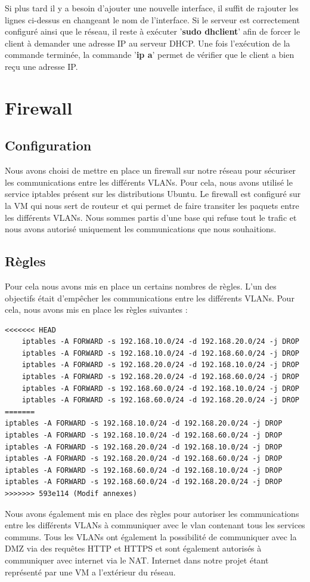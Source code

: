 \documentclass[a4paper,12pt,openany]{report}
\begin{document}
            Si plus tard il y a besoin d'ajouter une nouvelle interface, il suffit de rajouter les lignes ci-dessus en changeant le nom de l'interface.
            Si le serveur est correctement configuré ainsi que le réseau, il reste à exécuter '\textbf{sudo dhclient}' afin de forcer le client à demander une adresse IP au serveur DHCP.
            Une fois l'exécution de la commande terminée, la commande '\textbf{ip a}' permet de vérifier que le client a bien reçu une adresse IP.

        \section{Firewall}
            \subsection{Configuration}
            Nous avons choisi de mettre en place un firewall sur notre réseau pour sécuriser les communications entre les différents VLANs. Pour cela, nous avons utilisé le service iptables présent sur les distributions Ubuntu.
            Le firewall est configuré sur la VM qui nous sert de routeur et qui permet de faire transiter les paquets entre les différents VLANs. Nous sommes partis d'une base qui refuse tout le trafic et nous avons autorisé uniquement les communications que nous souhaitions.

            \subsection{Règles}
            Pour cela nous avons mis en place un certains nombres de règles. L'un des objectifs était d'empêcher les communications entre les différents VLANs. Pour cela, nous avons mis en place les règles suivantes :
            \begin{verbatim}
<<<<<<< HEAD
    iptables -A FORWARD -s 192.168.10.0/24 -d 192.168.20.0/24 -j DROP
    iptables -A FORWARD -s 192.168.10.0/24 -d 192.168.60.0/24 -j DROP
    iptables -A FORWARD -s 192.168.20.0/24 -d 192.168.10.0/24 -j DROP
    iptables -A FORWARD -s 192.168.20.0/24 -d 192.168.60.0/24 -j DROP
    iptables -A FORWARD -s 192.168.60.0/24 -d 192.168.10.0/24 -j DROP
    iptables -A FORWARD -s 192.168.60.0/24 -d 192.168.20.0/24 -j DROP
=======
iptables -A FORWARD -s 192.168.10.0/24 -d 192.168.20.0/24 -j DROP
iptables -A FORWARD -s 192.168.10.0/24 -d 192.168.60.0/24 -j DROP
iptables -A FORWARD -s 192.168.20.0/24 -d 192.168.10.0/24 -j DROP
iptables -A FORWARD -s 192.168.20.0/24 -d 192.168.60.0/24 -j DROP
iptables -A FORWARD -s 192.168.60.0/24 -d 192.168.10.0/24 -j DROP
iptables -A FORWARD -s 192.168.60.0/24 -d 192.168.20.0/24 -j DROP
>>>>>>> 593e114 (Modif annexes)
            \end{verbatim}
            Nous avons également mis en place des règles pour autoriser les communications entre les différents VLANs à communiquer avec le vlan contenant tous les services communs. Tous les VLANs ont également la possibilité de communiquer avec la DMZ via des requêtes HTTP et HTTPS et sont également autorisés à communiquer avec internet via le NAT. Internet dans notre projet étant représenté par une VM a l'extérieur du réseau. 
\end{document}
